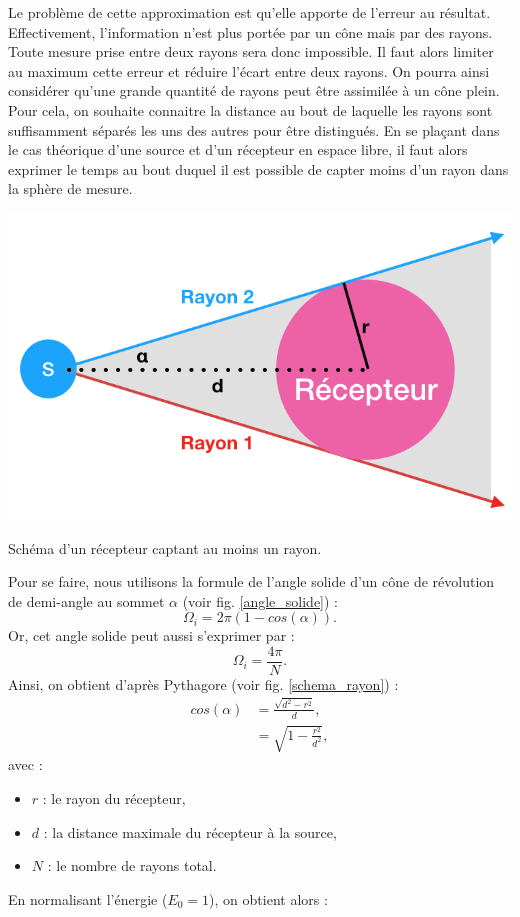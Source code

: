  Le problème de cette approximation est qu'elle apporte de l'erreur au résultat. Effectivement, l'information n'est plus portée par un cône mais par des rayons. Toute mesure prise entre deux rayons sera donc impossible. Il faut alors limiter au maximum cette erreur et réduire l'écart entre deux rayons. On pourra ainsi considérer qu'une grande quantité de rayons peut être assimilée à un cône plein. Pour cela, on souhaite connaitre la distance au bout de laquelle les rayons sont suffisamment séparés les uns des autres pour être distingués. En se plaçant dans le cas théorique d'une source et d'un récepteur en espace libre, il faut alors exprimer le temps au bout duquel il est possible de capter moins d'un rayon dans la sphère de mesure. 
%
\begin{figureth}
	\includegraphics[width=0.7\linewidth]{images/schema_rayon}
	\caption{Schéma d'un récepteur captant au moins un rayon.}
	\label{schema_rayon}
\end{figureth}
%
Pour se faire, nous utilisons la formule de l'angle solide d'un cône de révolution \cite[Angle solide d'un cône de révolution]{cone} de demi-angle au sommet $\alpha$ (voir fig. \ref{angle_solide}) :
\begin{equation}
	\Omega_i = 2\pi(1-cos(\alpha)).
\end{equation}
%
Or, cet angle solide peut aussi s'exprimer par :
\begin{equation}
	\Omega_i = \frac{4\pi}{N}.
\end{equation}
%
Ainsi, on obtient d'après Pythagore (voir fig. \ref{schema_rayon}) :
\begin{align}
	cos(\alpha) & =  \frac{\sqrt{d^2-r^2}}{d}, \nonumber \\
	& =  \sqrt{1-\frac{r^2}{d^2}},
\end{align}
avec  :
\begin{itemize}
\item $r$ : le rayon du récepteur,
\item $d$ : la distance maximale du récepteur à la source,
\item $N$ : le nombre de rayons total.
\end{itemize}
%
En normalisant l'énergie ($E_0 = 1$), on obtient alors :


